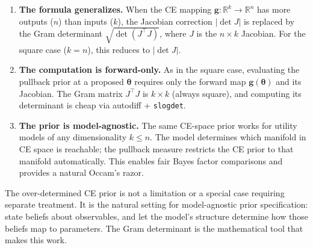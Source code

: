 \documentclass[11pt,a4paper]{article}
\theoremstyle{definition}
\newcommand{\btheta}{\boldsymbol{\theta}}
\begin{document}
\begin{keyresult}
\begin{enumerate}
    \item \textbf{The formula generalizes.} When the CE mapping
    $\mathbf{g}: \mathbb{R}^k \to \mathbb{R}^n$ has more outputs ($n$) than
    inputs ($k$), the Jacobian correction $|\!\det J|$ is replaced by the Gram
    determinant $\sqrt{\det(J^\top J)}$, where $J$ is the $n \times k$
    Jacobian. For the square case ($k = n$), this reduces to $|\!\det J|$.

    \item \textbf{The computation is forward-only.} As in the square case,
    evaluating the pullback prior at a proposed $\btheta$ requires only the
    forward map $\mathbf{g}(\btheta)$ and its Jacobian. The Gram matrix
    $J^\top J$ is $k \times k$ (always square), and computing its determinant
    is cheap via autodiff + \texttt{slogdet}.

    \item \textbf{The prior is model-agnostic.} The same CE-space prior works
    for utility models of any dimensionality $k \leq n$. The model determines
    which manifold in CE space is reachable; the pullback measure restricts
    the CE prior to that manifold automatically. This enables fair Bayes
    factor comparisons and provides a natural Occam's razor.
\end{enumerate}
\end{keyresult}

\noindent
The over-determined CE prior is not a limitation or a special case requiring
separate treatment. It is the natural setting for model-agnostic prior
specification: state beliefs about observables, and let the model's
structure determine how those beliefs map to parameters. The Gram determinant
is the mathematical tool that makes this work.
\end{document}
